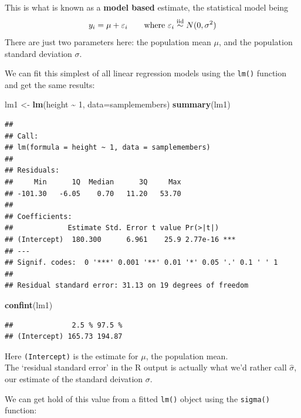 \documentclass[
]{book}
\newenvironment{Shaded}{\begin{snugshade}}{\end{snugshade}}
\newcommand{\AttributeTok}[1]{\textcolor[rgb]{0.13,0.29,0.53}{#1}}
\newcommand{\DecValTok}[1]{\textcolor[rgb]{0.00,0.00,0.81}{#1}}
\newcommand{\FunctionTok}[1]{\textcolor[rgb]{0.13,0.29,0.53}{\textbf{#1}}}
\newcommand{\NormalTok}[1]{#1}
\newcommand{\OtherTok}[1]{\textcolor[rgb]{0.56,0.35,0.01}{#1}}
\newcommand{\SpecialCharTok}[1]{\textcolor[rgb]{0.81,0.36,0.00}{\textbf{#1}}}
\begin{document}
This is what is known as a \textbf{model based} estimate, the statistical model being
\begin{equation}
   y_i = \mu + \varepsilon_i \qquad \text{where $\varepsilon_i\overset{\rm iid}{\sim} N(0,\sigma^2)$}
   \label{eq:simplelinearmodel}
\end{equation}
There are just two parameters here: the population mean \(\mu\), and the population
standard deviation \(\sigma\).

We can fit this simplest of all linear regression models using the \texttt{lm()} function and
get the same results:

\begin{Shaded}
\begin{Highlighting}[]
\NormalTok{lm1 }\OtherTok{\textless{}{-}} \FunctionTok{lm}\NormalTok{(height }\SpecialCharTok{\textasciitilde{}} \DecValTok{1}\NormalTok{, }\AttributeTok{data=}\NormalTok{samplemembers)}
\FunctionTok{summary}\NormalTok{(lm1)}
\end{Highlighting}
\end{Shaded}

\begin{verbatim}
## 
## Call:
## lm(formula = height ~ 1, data = samplemembers)
## 
## Residuals:
##     Min      1Q  Median      3Q     Max 
## -101.30   -6.05    0.70   11.20   53.70 
## 
## Coefficients:
##             Estimate Std. Error t value Pr(>|t|)    
## (Intercept)  180.300      6.961    25.9 2.77e-16 ***
## ---
## Signif. codes:  0 '***' 0.001 '**' 0.01 '*' 0.05 '.' 0.1 ' ' 1
## 
## Residual standard error: 31.13 on 19 degrees of freedom
\end{verbatim}

\begin{Shaded}
\begin{Highlighting}[]
\FunctionTok{confint}\NormalTok{(lm1)}
\end{Highlighting}
\end{Shaded}

\begin{verbatim}
##              2.5 % 97.5 %
## (Intercept) 165.73 194.87
\end{verbatim}

Here \texttt{(Intercept)} is the estimate for \(\mu\), the population mean.\\
The `residual standard error' in the R output is actually what we'd rather
call \(\widehat{\sigma}\), our estimate of the standard deivation \(\sigma\).

We can get hold of this value from a fitted \texttt{lm()} object using the \texttt{sigma()}
function:
\end{document}
